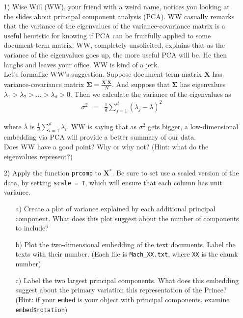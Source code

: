 \documentclass[letterpaper,12pt]{article}
\numberwithin{equation}{section}
\numberwithin{equation}{section}
\begin{document}
\begin{itemize}
\item[1)]  Wise Will (WW), your friend with a weird name, notices you looking at the slides about principal component analysis (PCA).   WW casually remarks that the variance of the eigenvalues of the variance-covariance matrix is a useful heuristic for knowing if PCA can be fruitfully applied to some document-term matrix.  WW, completely unsolicited, explains that as the variance of the eigenvalues goes up, the more useful PCA will be.  He then laughs and leaves your office.  WW is kind of a jerk.   \\

Let's formalize WW's suggestion. Suppose document-term matrix $\boldsymbol{X}$ has variance-covariance matrix $\boldsymbol{\Sigma} = \frac{\boldsymbol{X}^{'}\boldsymbol{X}}{N}$.  And suppose that $\boldsymbol{\Sigma}$ has eigenvalues $\lambda_{1}>\lambda_{2}>\hdots > \lambda_{d}>0$. Then we calculate the variance of the eigenvalues as
\begin{eqnarray}
\sigma^{2} & = & \frac{1}{d} \sum_{j=1}^{d}(\lambda_{j} - \bar{\lambda})^{2} \nonumber
\end{eqnarray}

where $\bar{\lambda}$ is $\frac{1}{d} \sum_{i=1}^{d} \lambda_{i}$. WW is saying that as $\sigma^{2}$ gets bigger, a low-dimensional embedding via PCA will provide a better summary of our data.   \\

Does WW have a good point?  Why or why not? (Hint: what do the eigenvalues represent?)
\item[2)] Apply the function {\tt prcomp} to $\boldsymbol{X}^{*}$. Be sure to set use a scaled version of the data, by setting {\tt scale = T}, which will ensure that each column has unit variance.
\begin{itemize}
\item[a)] Create a plot of variance explained by each additional principal component. What does this plot suggest about the number of components to include?
\item[b)] Plot the two-dimensional embedding of the text documents.  Label the texts with their number.  (Each file is {\tt Mach\_XX.txt}, where {\tt XX} is the chunk number)
\item[c)] Label the two largest principal components.  What does this embedding suggest about the primary variation this representation of the Prince?  (Hint: if your {\tt embed} is your object with principal components, examine {\tt embed\$rotation})
\end{itemize}



\end{itemize}
\end{document}
